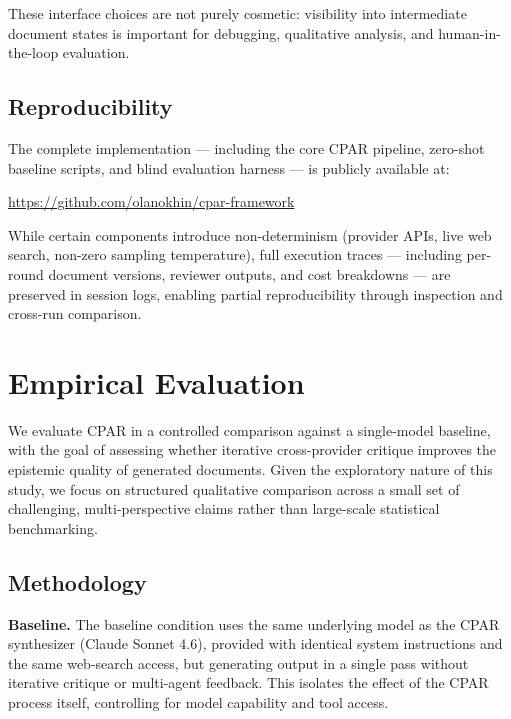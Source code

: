 \documentclass[11pt, a4paper]{article}
\begin{document}
These interface choices are not purely cosmetic: visibility into intermediate document states is important for debugging, qualitative analysis, and human-in-the-loop evaluation.

\subsection{Reproducibility}

The complete implementation --- including the core CPAR pipeline, zero-shot baseline scripts, and blind evaluation harness --- is publicly available at:
\begin{center}
\url{https://github.com/olanokhin/cpar-framework}
\end{center}
While certain components introduce non-determinism (provider APIs, live web search, non-zero sampling temperature), full execution traces --- including per-round document versions, reviewer outputs, and cost breakdowns --- are preserved in session logs, enabling partial reproducibility through inspection and cross-run comparison.

\section{Empirical Evaluation}
\label{sec:evaluation}

We evaluate CPAR in a controlled comparison against a single-model baseline, with the goal of assessing whether iterative cross-provider critique improves the epistemic quality of generated documents. Given the exploratory nature of this study, we focus on structured qualitative comparison across a small set of challenging, multi-perspective claims rather than large-scale statistical benchmarking.

\subsection{Methodology}

\textbf{Baseline.} The baseline condition uses the same underlying model as the CPAR synthesizer (Claude Sonnet 4.6), provided with identical system instructions and the same web-search access, but generating output in a single pass without iterative critique or multi-agent feedback. This isolates the effect of the CPAR process itself, controlling for model capability and tool access.
\end{document}
